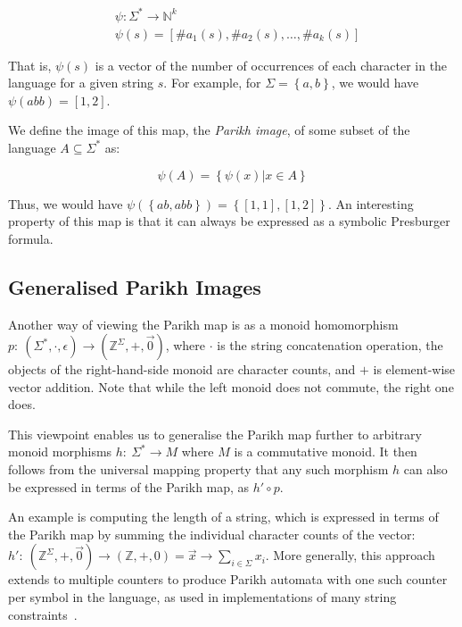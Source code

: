 \documentclass{easychair}
\begin{document}
$$
\begin{aligned}
& \psi: \Sigma^* \rightarrow \mathbb{N}^k \\
& \psi(s) = \left[\#a_1(s), \#a_2(s), \ldots, \#a_k(s)\right]
\end{aligned}
$$

That is, $\psi(s)$ is a vector of the number of occurrences of each character in the language for a given string $s$. For example, for  $\Sigma = \left \{ a, b\right\}$, we would have $\psi(abb) = \left[1, 2\right]$.

We define the image of this map, the \textit{Parikh image}, of some subset of the language $A \subseteq \Sigma^*$ as:

$$
\psi(A) = \left\{ \psi(x) | x \in A \right\}
$$

Thus, we would have $\psi(\left\{ab, abb\right\}) = \left\{\left[1, 1\right], \left[1, 2\right]\right\}$. An interesting property of this map is that it can always be expressed as a symbolic Presburger formula.

\subsection{Generalised Parikh Images}\label{sec:generalised}

Another way of viewing the Parikh map is as a monoid homomorphism $p:\: \left(\Sigma^*, \cdot, \epsilon \right) \to (\mathbb{Z}^\Sigma, +, \vec{0})$, where $\cdot$ is the string concatenation operation, the objects of the right-hand-side monoid are character counts, and $+$ is element-wise vector addition. Note that while the left monoid does not commute, the right one does.

This viewpoint enables us to generalise the Parikh map further to arbitrary monoid morphisms $h:\: \Sigma^* \to M$ where $M$ is a commutative monoid. It then follows from the universal mapping property that any such morphism $h$ can also be expressed in terms of the Parikh map, as $h' \circ p$.

An example is computing the length of a string, which is expressed in terms of
the Parikh map by summing the individual character counts of the vector: $h':\:
(\mathbb{Z}^\Sigma, +, \vec{0}) \to (\mathbb{Z}, +, 0) = \vec{x} \to \sum_{i \in
\Sigma} x_i$. More generally, this approach extends to multiple counters to
produce Parikh automata with one such counter per symbol in the language, as
used in implementations of many string
constraints~\cite{path-feasibility-strings}.
\end{document}
